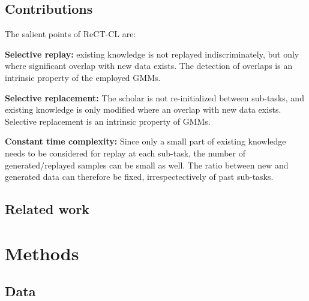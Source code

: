 \documentclass{article} %
\begin{document}
\subsection{Contributions}
The salient points of ReCT-CL are:
%
\par\noindent\textbf{Selective replay:} existing knowledge is not replayed indiscriminately, but only where significant overlap with new data exists. The detection of overlaps is an intrinsic property of the employed GMMs.
%
\par\noindent\textbf{Selective replacement:} The scholar is not re-initialized between sub-tasks, and existing knowledge is only 
modified where an overlap with new data exists. Selective replacement is an intrinsic property of GMMs.
%
\par\noindent\textbf{Constant time complexity:} Since only a small part of existing knowledge needs to be considered for replay at each sub-task, the number of generated/replayed samples can be small as well. The ratio between new and generated data can therefore be fixed, irrespectectively of past sub-tasks.
%
\subsection{Related work}


\section{Methods}
\label{sec:methods}
%
\subsection{Data}\label{sec:data}
%
\end{document}
